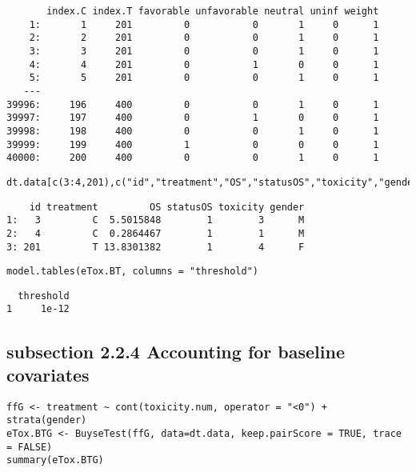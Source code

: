 \documentclass[12pt]{article}
\begin{document}
\begin{verbatim}
       index.C index.T favorable unfavorable neutral uninf weight
    1:       1     201         0           0       1     0      1
    2:       2     201         0           0       1     0      1
    3:       3     201         0           0       1     0      1
    4:       4     201         0           1       0     0      1
    5:       5     201         0           0       1     0      1
   ---                                                           
39996:     196     400         0           0       1     0      1
39997:     197     400         0           1       0     0      1
39998:     198     400         0           0       1     0      1
39999:     199     400         1           0       0     0      1
40000:     200     400         0           0       1     0      1
\end{verbatim}

\lstset{language=r,label= ,caption= ,captionpos=b,numbers=none}
\begin{lstlisting}
dt.data[c(3:4,201),c("id","treatment","OS","statusOS","toxicity","gender")]
\end{lstlisting}

\begin{verbatim}
    id treatment         OS statusOS toxicity gender
1:   3         C  5.5015848        1        3      M
2:   4         C  0.2864467        1        1      M
3: 201         T 13.8301382        1        4      F
\end{verbatim}


\lstset{language=r,label= ,caption= ,captionpos=b,numbers=none}
\begin{lstlisting}
model.tables(eTox.BT, columns = "threshold")
\end{lstlisting}

\begin{verbatim}
  threshold
1     1e-12
\end{verbatim}

\subsection{subsection 2.2.4 Accounting for baseline covariates}
\label{sec:org4813f22}

\lstset{language=r,label= ,caption= ,captionpos=b,numbers=none}
\begin{lstlisting}
ffG <- treatment ~ cont(toxicity.num, operator = "<0") + strata(gender)
eTox.BTG <- BuyseTest(ffG, data=dt.data, keep.pairScore = TRUE, trace = FALSE)
summary(eTox.BTG)
\end{lstlisting}
\end{document}
